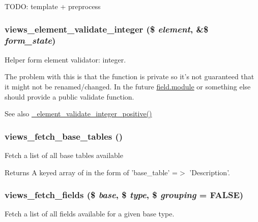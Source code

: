 TODO: template + preprocess \hypertarget{admin_8inc_a31abc35bd1848799b48a57136d0ab330}{
\subsubsection[{views\_\-element\_\-validate\_\-integer}]{\setlength{\rightskip}{0pt plus 5cm}views\_\-element\_\-validate\_\-integer (\$ {\em element}, \/  \&\$ {\em form\_\-state})}}
\label{admin_8inc_a31abc35bd1848799b48a57136d0ab330}
Helper form element validator: integer.

The problem with this is that the function is private so it's not guaranteed that it might not be renamed/changed. In the future \hyperlink{field_8module}{field.module} or something else should provide a public validate function.

\begin{DoxySeeAlso}{See also}
\hyperlink{field_8module_a8a204417f7ec4289d828b223afa22c57}{\_\-element\_\-validate\_\-integer\_\-positive()} 
\end{DoxySeeAlso}
\hypertarget{admin_8inc_a36ed4b1513b45a8a358d2cb3fb287d06}{
\subsubsection[{views\_\-fetch\_\-base\_\-tables}]{\setlength{\rightskip}{0pt plus 5cm}views\_\-fetch\_\-base\_\-tables ()}}
\label{admin_8inc_a36ed4b1513b45a8a358d2cb3fb287d06}
Fetch a list of all base tables available

\begin{DoxyReturn}{Returns}
A keyed array of in the form of 'base\_\-table' =$>$ 'Description'. 
\end{DoxyReturn}
\hypertarget{admin_8inc_afae9fab40ab9d39b71644d2bb27d2703}{
\subsubsection[{views\_\-fetch\_\-fields}]{\setlength{\rightskip}{0pt plus 5cm}views\_\-fetch\_\-fields (\$ {\em base}, \/  \$ {\em type}, \/  \$ {\em grouping} = {\ttfamily FALSE})}}
\label{admin_8inc_afae9fab40ab9d39b71644d2bb27d2703}
Fetch a list of all fields available for a given base type.


